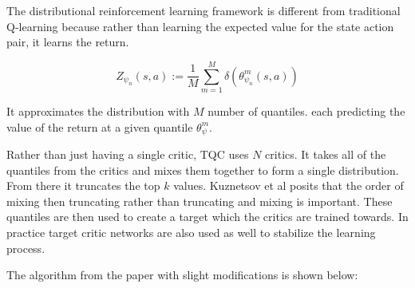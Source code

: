 The distributional reinforcement learning framework \cite{bellemareDistributionalPerspectiveReinforcement2017} is different from traditional Q-learning because rather than learning the expected value for the state action pair, it learns the return.

$$Z_{\psi_n}(s, a) := \frac{1}{M} \sum_{m=1}^{M} \delta \left(\theta_{\psi_n}^m(s, a) \right)$$

It approximates the distribution with $M$ number of quantiles. each predicting the value of the return at a given quantile $\theta_{\psi}^{m}$. 

Rather than just having a single critic, TQC uses $N$ critics. It takes all of the quantiles from the critics and mixes them together to form a single distribution. From there it truncates the top $k$ values. Kuznetsov et al \cite{kuznetsovControllingOverestimationBias2020} posits that the order of mixing then truncating rather than truncating and mixing is important. These quantiles are then used to create a target which the critics are trained towards. In practice target critic networks are also used as well to stabilize the learning process.

The algorithm from the paper \cite{kuznetsovControllingOverestimationBias2020} with slight modifications is shown below:

